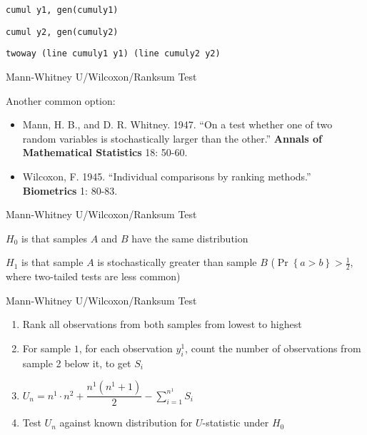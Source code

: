 \documentclass{beamer}
\begin{document}
\begin{frame}
    \begin{card}[STATA]
        \texttt{cumul y1, gen(cumuly1)}
        
        \texttt{cumul y2, gen(cumuly2)}
        
        \texttt{twoway (line cumuly1 y1) (line cumuly2 y2)}
    \end{card}
\end{frame}

\begin{frame}{Mann-Whitney U/Wilcoxon/Ranksum Test}
\begin{card}
Another common option: 
	\begin{itemize}
		\item Mann, H. B., and D. R. Whitney. 1947. ``On a test whether one of two random variables is stochastically larger than the other.''  \textbf{Annals of Mathematical Statistics} 18: 50-60.
		\item Wilcoxon, F. 1945. ``Individual comparisons by ranking methods.''  \textbf{Biometrics} 1: 80-83.
	\end{itemize}
\end{card}
\end{frame}


\begin{frame}{Mann-Whitney U/Wilcoxon/Ranksum Test}
\begin{card}
 $H_0$ is that samples $A$ and $B$ have the same distribution
 
 
 $H_1$ is that sample $A$ is stochastically greater than sample $B$ ($\Pr\left\{a>b \right\}>\tfrac{1}{2}$, where two-tailed tests are less common)

\end{card}
\end{frame}

\begin{frame}{Mann-Whitney U/Wilcoxon/Ranksum Test}
\begin{card}
	\begin{enumerate}
		\item Rank all observations from both samples from lowest to highest
		\item For sample $1$, for each observation $y^1_i$, count the number of observations from sample 2 below it, to get $S_i$
		\item $U_n=n^1\cdot n^2+\dfrac{n^1(n^1+1)}{2}-\sum_{i=1}^{n^1} S_i$
		\item Test $U_n$ against known distribution for $U$-statistic under $H_0$
	\end{enumerate}
\end{card}
\end{frame}
\end{document}
